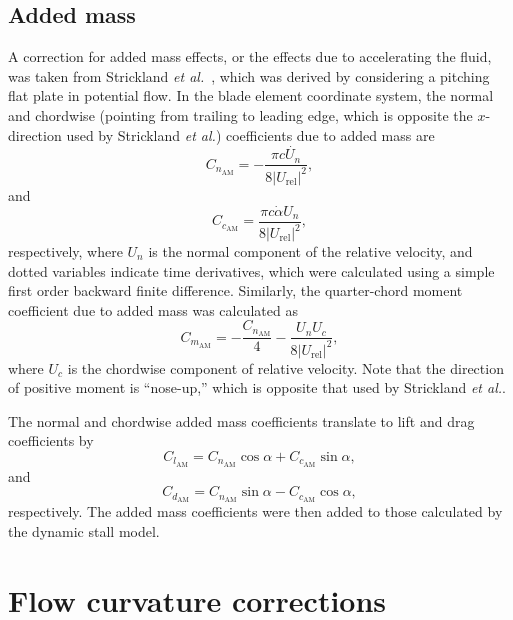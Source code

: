 \subsection{Added mass}

A correction for added mass effects, or the effects due to accelerating the
fluid, was taken from Strickland \emph{et al.}~\cite{Strickland1981}, which was
derived by considering a pitching flat plate in potential flow. In the blade
element coordinate system, the normal and chordwise (pointing from trailing to
leading edge, which is opposite the $x$-direction used by Strickland \emph{et
    al.}) coefficients due to added mass are
\begin{equation}
    C_{n_\mathrm{AM}} = -\frac{\pi c \dot{U_n}}{8 | U_\mathrm{rel} |^2}, 
\end{equation}
and
\begin{equation}
    C_{c_\mathrm{AM}} = \frac{\pi c \dot{\alpha} U_n }{8 | U_\mathrm{rel} |^2}, 
\end{equation}
respectively, where $U_n$ is the normal component of the relative velocity, and
dotted variables indicate time derivatives, which were calculated using a simple
first order backward finite difference. Similarly, the quarter-chord moment
coefficient due to added mass was calculated as
\begin{equation}
    C_{m_\mathrm{AM}} = -\frac{C_{n_\mathrm{AM}}}{4} 
        - \frac{U_n U_c}{8 | U_\mathrm{rel} |^2},
\end{equation}
where $U_c$ is the chordwise component of relative velocity. Note that the
direction of positive moment is ``nose-up,'' which is opposite that used by
Strickland \emph{et al.}.

The normal and chordwise added mass coefficients translate to lift and drag
coefficients by
\begin{equation}
    C_{l_\mathrm{AM}} = C_{n_\mathrm{AM}} \cos \alpha + C_{c_\mathrm{AM}} \sin
    \alpha,
\end{equation}
and
\begin{equation}
    C_{d_\mathrm{AM}} = C_{n_\mathrm{AM}} \sin \alpha - C_{c_\mathrm{AM}} \cos
    \alpha,
\end{equation}
respectively. The added mass coefficients were then added to those calculated by
the dynamic stall model.


\section{Flow curvature corrections}

